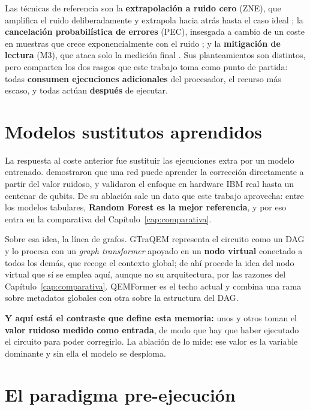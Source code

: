 Las técnicas de referencia son la \textbf{extrapolación a ruido cero} (ZNE), que amplifica el
ruido deliberadamente y extrapola hacia atrás hasta el caso ideal \cite{temme2017error}; la
\textbf{cancelación probabilística de errores} (PEC), insesgada a cambio de un coste en
muestras que crece exponencialmente con el ruido \cite{cai2023quantum}; y la
\textbf{mitigación de lectura} (M3), que ataca solo la medición final
\cite{nation2023suppressing}. Sus planteamientos son distintos, pero comparten los dos rasgos
que este trabajo toma como punto de partida: todas \textbf{consumen ejecuciones adicionales}
del procesador, el recurso más escaso, y todas actúan \textbf{después} de ejecutar.

\section{Modelos sustitutos aprendidos}
\label{sec:ml_qem}

La respuesta al coste anterior fue sustituir las ejecuciones extra por un modelo entrenado.
 demostraron que una red puede aprender la corrección directamente a
partir del valor ruidoso, y validaron el enfoque en hardware IBM real hasta un centenar de
qubits. De su ablación sale un dato que este trabajo aprovecha: entre los modelos tabulares,
\textbf{Random Forest es la mejor referencia}, y por eso entra en la comparativa del
Capítulo~\ref{cap:comparativa}.

Sobre esa idea, la línea de grafos. GTraQEM \cite{bao2025gtraqem} representa el circuito como
un DAG y lo procesa con un \textit{graph transformer} apoyado en un \textbf{nodo virtual}
conectado a todos los demás, que recoge el contexto global; de ahí procede la idea del nodo
virtual que sí se emplea aquí, aunque no su arquitectura, por las razones del
Capítulo~\ref{cap:comparativa}. QEMFormer \cite{bao2025qemformer} es el techo actual y combina
una rama sobre metadatos globales con otra sobre la estructura del DAG.

\textbf{Y aquí está el contraste que define esta memoria:} unos y otros toman el \textbf{valor
ruidoso medido como entrada}, de modo que hay que haber ejecutado el circuito para poder
corregirlo. La ablación de  lo mide: ese valor es la variable dominante
y sin ella el modelo se desploma.

\section{El paradigma pre-ejecución}
\label{sec:preejecucion}

